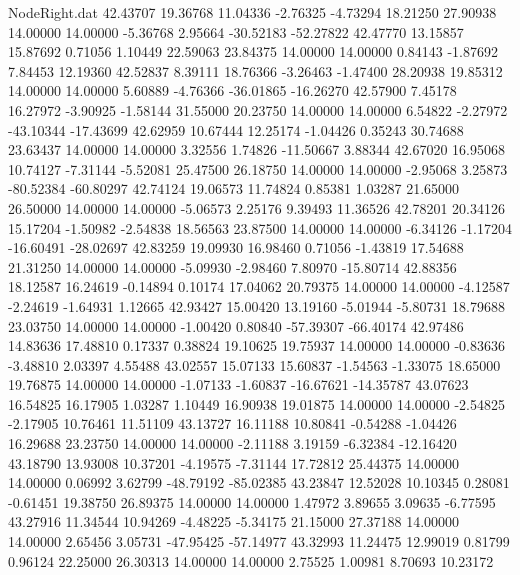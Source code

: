 \begin{filecontents}{NodeRight.dat}
  42.43707   19.36768   11.04336    -2.76325   -4.73294   18.21250   27.90938   14.00000   14.00000   -5.36768    2.95664  -30.52183  -52.27822
  42.47770   13.15857   15.87692     0.71056    1.10449   22.59063   23.84375   14.00000   14.00000    0.84143   -1.87692    7.84453   12.19360
  42.52837    8.39111   18.76366    -3.26463   -1.47400   28.20938   19.85312   14.00000   14.00000    5.60889   -4.76366  -36.01865  -16.26270
  42.57900    7.45178   16.27972    -3.90925   -1.58144   31.55000   20.23750   14.00000   14.00000    6.54822   -2.27972  -43.10344  -17.43699
  42.62959   10.67444   12.25174    -1.04426    0.35243   30.74688   23.63437   14.00000   14.00000    3.32556    1.74826  -11.50667    3.88344
  42.67020   16.95068   10.74127    -7.31144   -5.52081   25.47500   26.18750   14.00000   14.00000   -2.95068    3.25873  -80.52384  -60.80297
  42.74124   19.06573   11.74824     0.85381    1.03287   21.65000   26.50000   14.00000   14.00000   -5.06573    2.25176    9.39493   11.36526
  42.78201   20.34126   15.17204    -1.50982   -2.54838   18.56563   23.87500   14.00000   14.00000   -6.34126   -1.17204  -16.60491  -28.02697
  42.83259   19.09930   16.98460     0.71056   -1.43819   17.54688   21.31250   14.00000   14.00000   -5.09930   -2.98460    7.80970  -15.80714
  42.88356   18.12587   16.24619    -0.14894    0.10174   17.04062   20.79375   14.00000   14.00000   -4.12587   -2.24619   -1.64931    1.12665
  42.93427   15.00420   13.19160    -5.01944   -5.80731   18.79688   23.03750   14.00000   14.00000   -1.00420    0.80840  -57.39307  -66.40174
  42.97486   14.83636   17.48810     0.17337    0.38824   19.10625   19.75937   14.00000   14.00000   -0.83636   -3.48810    2.03397    4.55488
  43.02557   15.07133   15.60837    -1.54563   -1.33075   18.65000   19.76875   14.00000   14.00000   -1.07133   -1.60837  -16.67621  -14.35787
  43.07623   16.54825   16.17905     1.03287    1.10449   16.90938   19.01875   14.00000   14.00000   -2.54825   -2.17905   10.76461   11.51109
  43.13727   16.11188   10.80841    -0.54288   -1.04426   16.29688   23.23750   14.00000   14.00000   -2.11188    3.19159   -6.32384  -12.16420
  43.18790   13.93008   10.37201    -4.19575   -7.31144   17.72812   25.44375   14.00000   14.00000    0.06992    3.62799  -48.79192  -85.02385
  43.23847   12.52028   10.10345     0.28081   -0.61451   19.38750   26.89375   14.00000   14.00000    1.47972    3.89655    3.09635   -6.77595
  43.27916   11.34544   10.94269    -4.48225   -5.34175   21.15000   27.37188   14.00000   14.00000    2.65456    3.05731  -47.95425  -57.14977
  43.32993   11.24475   12.99019     0.81799    0.96124   22.25000   26.30313   14.00000   14.00000    2.75525    1.00981    8.70693   10.23172

\end{filecontents}
